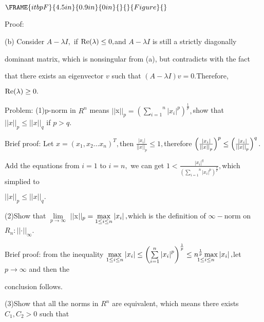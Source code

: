 \documentclass{article}
\begin{document}
$\FRAME{itbpF}{4.5in}{0.9in}{0in}{}{}{Figure}{\special{language "Scientific
Word";type "GRAPHIC";maintain-aspect-ratio TRUE;display "USEDEF";valid_file
"T";width 4.5in;height 0.9in;depth 0in;original-width
9.3962in;original-height 2.6671in;cropleft "0";croptop "1";cropright
"1";cropbottom "0";tempfilename 'NURK3H01.wmf';tempfile-properties "XPR";}}$

Proof:

(b) Consider $A-\lambda I,$ if $\mathop{\rm Re}(\lambda )\leq 0,$and $A-\lambda I$
is still a strictly diagonally

dominant matrix, which is nonsingular from (a), but contradicts with the fact

that there exists an eigenvector $v$ such that $\left( A-\lambda I\right)
v=0.$Therefore,

$\mathop{\rm Re}(\lambda )\geq 0.$

Problem: (1)p-norm in $R^{n}$ means $||$x$||_{p}=\left( \overset{n}{\underset%
{i=1}{\sum }}\left\vert x_{i}\right\vert ^{p}\right) ^{\frac{1}{p}}, $show
that $||x||_{p}\leq ||x||_{q}$ if $p>q.$

Brief proof: Let $x=(x_{1},x_{2}...x_{n})^{T},$then $\frac{\left\vert
x_{i}\right\vert }{\left\vert \left\vert x\right\vert \right\vert _{p}}\leq
1,$therefore $\left( \frac{\left\vert x_{i}\right\vert }{\left\vert
\left\vert x\right\vert \right\vert _{p}}\right) ^{p}\leq \left( \frac{%
\left\vert x_{i}\right\vert }{\left\vert \left\vert x\right\vert \right\vert
_{p}}\right) ^{q}.$

Add the equations from $i=1$ to $i=n,$ we can get $1<\frac{\left\vert
x_{i}\right\vert ^{q}}{\left( \overset{n}{\underset{i=1}{\sum }}\left\vert
x_{i}\right\vert ^{p}\right) ^{\frac{q}{p}}},$which simplied to

$||x||_{p}\leq ||x||_{q}.$

(2)Show that $\underset{p\rightarrow \infty }{\lim }$ $||$x$||_{p}=\underset{%
1\leq i\leq n}{\max }\left\vert x_{i}\right\vert ,$which is the definition
of $\infty -$norm on $R_{n}:\left\vert \left\vert \cdot \right\vert
\right\vert _{\infty }$.

Brief proof: from the inequality $\underset{1\leq i\leq n}{\max }\left\vert
x_{i}\right\vert \leq \left( \overset{n}{\underset{i=1}{\sum }}\left\vert
x_{i}\right\vert ^{p}\right) ^{\frac{1}{p}}\leq \underset{1\leq i\leq n}{n^{%
\frac{1}{p}}\max }\left\vert x_{i}\right\vert ,$let $p\rightarrow \infty $
and then the

conclusion follows.

(3)Show that all the norms in $R^{n}$ are equivalent, which means there
exists $C_{1},C_{2}>0$ such that
\end{document}
